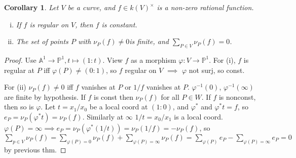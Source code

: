\documentclass{article}
\theoremstyle{definition}
\theoremstyle{remark}
\theoremstyle{plain}
\newtheorem{crly}[defn]{Corollary}
\newcommand{\PP}{\mathbb{P}}
\newcommand{\bA}{\mathbb{A}}
\begin{document}
\begin{crly}
    Let $V$ be a curve, and $f\in k(V)^\times$ is a non-zero rational function. \begin{enumerate}[(i)]
        \item If $f$ is regular on $V$, then $f$ is constant.
        \item The set of points $P$ with $\nu_P(f)\neq 0$is finite, and $\sum_{P\in V}\nu_P(f)=0$.
    \end{enumerate}
\end{crly}
\begin{proof}
    Use $\bA^1\to\PP^1, t\mapsto (1:t)$. View $f$ as a morphism $\varphi:V\to\PP^1$. For (i), $f$ is regular at $P$ iff $\varphi(P)\neq( 0:1)$, so $f$ regular on $V$ $\implies$ $\varphi$ not surj, so const.

    For (ii) $\nu_P(f)\neq 0$ iff $f$ vanishes at $P$ or $1/f$ vanishes at $P$. $\varphi^{-1}(0)$, $\varphi^{-1}(\infty)$ are finite by hypothesis. If $f$ is const then $\nu_P(f)$ for all $P\in W$. If $f$ is nonconst, then so is $\varphi$. Let $t=x_1/x_0$ be a local coord at $(1:0)$, and $\varphi^\ast$ and $\varphi^\ast t= f$, so $e_P=\nu_P(\varphi^\ast t)=\nu_P(f)$. Similarly at $\infty$ $1/t=x_0/x_1$ is a local coord. $\varphi(P)=\infty\implies e_P=\nu_P(\varphi^\ast(1/t))=\nu_P(1/f)=-\nu_P(f)$, so $\sum_{p\in V}\nu_P(f)=\sum_{\varphi(P)=0}\nu_P(f)+\sum_{\varphi(P)=\infty}\nu_P(f)=\sum_{\varphi(P)}e_P-\sum_{\varphi(P)=\infty}e_P=0$ by previous thm.
\end{proof}
\end{document}

